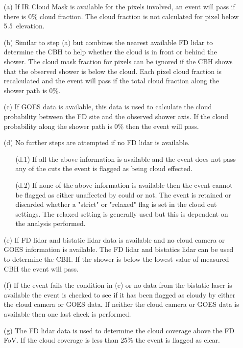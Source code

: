 \begin{itemize}
\item[(a)] If IR Cloud Mask is available for the pixels involved, an event will pass if there is 0\% cloud fraction. The cloud fraction is not calculated for pixel below 5.5\textdegree \ elevation. 
\item[(b)] Similar to step (a) but combines the nearest available FD lidar to determine the CBH to help whether the cloud is in front or behind the shower. The cloud mask fraction for pixels can be ignored if the CBH shows that the observed shower is below the cloud. Each pixel cloud fraction is recalculated and the event will pass if the total cloud fraction along the shower path is 0\%.
\item[(c)] If GOES data is available, this data is used to calculate the cloud probability between the FD site and the observed shower axis. If the cloud probability along the shower path is 0\% then the event will pass.
\item[(d)] No further steps are attempted if no FD lidar is available.
\begin{itemize}
\item[(d.1)] If all the above information is available and the event does not pass any of the cuts the event is flagged as being cloud effected.
\item[(d.2)] If none of the above information is available then the event cannot be flagged as either unaffected by could or not. The event is retained or discarded whether a "strict" or "relaxed" flag is set in the cloud cut settings. The relaxed setting is generally used but this is dependent on the analysis performed.
\end{itemize}
\item[(e)] If FD lidar and bistatic lidar data is available and no cloud camera or GOES information is available. The FD lidar and bistatics lidar can be used to determine the CBH. If the shower is below the lowest value of measured CBH the event will pass.
\item[(f)] If the event fails the condition in (e) or no data from the bistatic laser is available the event is checked to see if it has been flagged as cloudy by either the cloud camera or GOES data. If neither the cloud camera or GOES data is available then one last check is performed.
\item[(g)] The FD lidar data is used to determine the cloud coverage above the FD FoV. If the cloud coverage is less than 25\% the event is flagged as clear.
\end{itemize}



